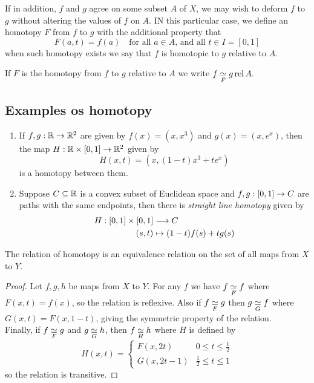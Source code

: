 If in addition, $f$ and $g$ agree on some subset $A$ of $X$, we may wish to deform $f$ to $g$ without altering the values of $f$ on $A$. IN this particular case, we define an homotopy $F$ from $f$ to $g$ with the additional property that 
\[
    F(a,t) = f(a) \quad \text{for all $a \in A$, and all $t \in I = [0,1]$}  
\]
when such homotopy exists we say that $f$ is homotopic to $g$ relative to $A$.

\begin{notn}
    If $F$ is the homotopy from $f$ to $g$ relative to $A$ we write $\displaystyle f \underset{F}{\simeq} g \operatorname{rel} A.$
\end{notn}

\subsection*{Examples os homotopy}
\begin{enumerate}
    \item If $f,g : \mathbb{R} \rightarrow \mathbb{R}^2$ are given by $f(x) = (x, x^3)$ and $g(x) = (x, e^x)$, then the map $H : \mathbb{R} \times [0,1] \rightarrow \mathbb{R}^2$ given by 
    \[
        H (x,t) = \left(x, (1-t)x^3 + te^x\right) 
    \]
    is a homotopy between them.
    \item Suppose $C \subseteq \mathbb{R}$ is a convex subset of Euclidean space and $f,g : [0,1] \rightarrow C$ are paths with the same endpoints, then there is \textit{straight line homotopy} given by
    \begin{align*}
        H : [0,1] \times [0,1] & \longrightarrow C \\
        (s,t) & \mapsto (1-t) f(s) + tg(s)
    \end{align*}


\end{enumerate}

\begin{lem}
    The relation of homotopy is an equivalence relation on the set of all maps from $X$ to $Y$.
\end{lem}
\begin{proof}
    Let $f,g,h$ be maps from $X$ to $Y$. For any $f$ we have $f \underset{F}{\simeq} f$ where $F(x,t) = f(x)$, so the relation is reflexive. Also if $f \underset{F}{\simeq} g$ then $g \underset{G}{\simeq} f$ where $G(x,t) = F(x, 1-t)$, giving the symmetric property of the relation.
    \\
    Finally, if $f \underset{F}{\simeq} g$ and $g \underset{G}{\simeq} h$, then $f \underset{H}{\simeq} h$ where $H$ is defined by
    \begin{equation*}
        H(x,t) = \begin{cases}
            F(x, 2t) & 0 \le t \le \frac12 \\
            G(x, 2t - 1) & \frac12 \le t \le 1
        \end{cases}
    \end{equation*}
    so the relation is transitive.
\end{proof}

